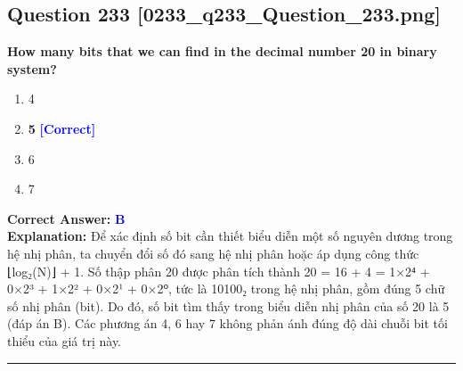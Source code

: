 \documentclass[11pt,a4paper]{article}
\begin{document}
\begin{minipage}{\textwidth}
\subsection*{Question 233 \quad \footnotesize{[0233\_q233\_Question\_233.png]}}
\noindent \textbf{How many bits that we can find in the decimal number 20 in binary system?}

\begin{enumerate}[label=\Alph*.]
    \item 4
    \item \textbf{5} \hfill \textcolor{blue}{\textbf{[Correct]}}
    \item 6
    \item 7
\end{enumerate}

\noindent \textbf{Correct Answer:} \textcolor{blue}{\textbf{B}} \\[2pt]
\noindent \textbf{Explanation:} Để xác định số bit cần thiết biểu diễn một số nguyên dương trong hệ nhị phân, ta chuyển đổi số đó sang hệ nhị phân hoặc áp dụng công thức ⌊log₂(N)⌋ + 1. Số thập phân 20 được phân tích thành 20 = 16 + 4 = 1×2⁴ + 0×2³ + 1×2² + 0×2¹ + 0×2⁰, tức là 10100₂ trong hệ nhị phân, gồm đúng 5 chữ số nhị phân (bit). Do đó, số bit tìm thấy trong biểu diễn nhị phân của số 20 là 5 (đáp án B). Các phương án 4, 6 hay 7 không phản ánh đúng độ dài chuỗi bit tối thiểu của giá trị này.

\par\vspace{0.3cm}
\hrule
\vspace{0.3cm}
\end{minipage}
\end{document}
